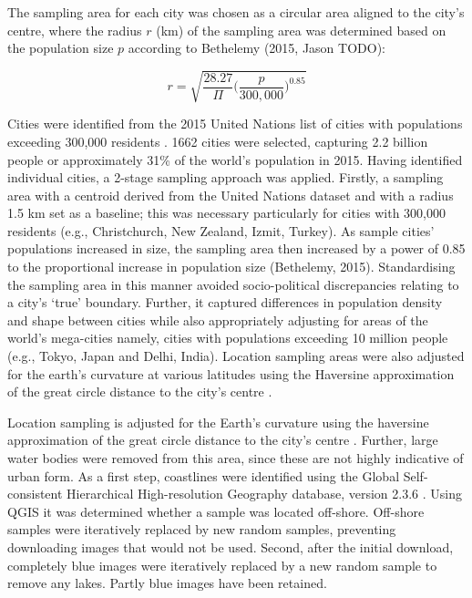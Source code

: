 \documentclass[sageh,times]{sagej}
\begin{document}
The sampling area for each city was chosen as a circular area aligned to the city's centre, where the radius $r$ (km) of the sampling area was determined based on the population size $p$ according to Bethelemy (2015, Jason TODO):

\begin{equation}
r = \sqrt{ \frac{28.27}{\Pi} \bigg( \frac{p}{300,000}  \bigg)^{0.85} }
\end{equation}

Cities were identified from the 2015 United Nations list of cities with populations exceeding 300,000 residents \citep{UN2014}. 1662 cities were selected, capturing 2.2 billion people or approximately 31\% of the world's population in 2015. Having identified individual cities, a 2-stage sampling approach was applied. Firstly, a sampling area with a centroid derived from the United Nations dataset and with a radius 1.5 km set as a baseline; this was necessary particularly for cities with 300,000 residents (e.g., Christchurch, New Zealand, Izmit, Turkey). As sample cities' populations increased in size, the sampling area then increased by a power of 0.85 to the proportional increase in population size (Bethelemy, 2015). Standardising the sampling area in this manner avoided socio-political discrepancies relating to a city's `true' boundary. Further, it captured differences in population density and shape between cities while also appropriately adjusting for areas of the world's mega-cities namely, cities with populations exceeding 10 million people (e.g., Tokyo, Japan and Delhi, India). Location sampling areas were also adjusted for the earth's curvature at various latitudes using the Haversine approximation of the great circle distance to the city's centre \citep{Sinnott1984}. 

Location sampling is adjusted for the Earth's curvature using the haversine approximation of the great circle distance to the city's centre \citep{Sinnott1984}. Further, large water bodies were removed from this area, since these are not highly indicative of urban form. As a first step, coastlines were identified using the Global Self-consistent Hierarchical High-resolution Geography database, version 2.3.6 \citep{Wessel1996}. Using QGIS \citep{QGIS2009} it was determined whether a sample was located off-shore. Off-shore samples were iteratively replaced by new random samples, preventing downloading images that would not be used. Second, after the initial download, completely blue images were iteratively replaced by a new random sample to remove any lakes. Partly blue images have been retained.
\end{document}
